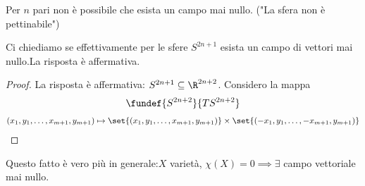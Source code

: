 \begin{cor}
 Per $n$ pari non è possibile che esista un campo mai nullo.
 ("La sfera non è pettinabile")
\end{cor}
\begin{prop}
 Ci chiediamo se effettivamente per le sfere $S^{2n+1}$ esista un campo di vettori mai nullo.La risposta è affermativa.
\end{prop}
\begin{proof}
La risposta è affermativa: $S^{2n+1}\subseteq\R^{2n+2}$. Considero la mappa 
\begin{align*}
 \fundef{S^{2n+2}}{TS^{2n+2}}
\end{align*}
\begin{align*}
 (x_1, y_1,\dots, x_{m+1}, y_{m+1})\mapsto \set{(x_1, y_1,\dots, x_{m+1}, y_{m+1})}\times\set{(-x_1, y_1,\dots, -x_{m+1}, y_{m+1})}
\end{align*}


\end{proof}
\begin{oss}
 Questo fatto è vero più in generale:$X$ varietà, $\chi(X)=0\implies \exists$ campo vettoriale mai nullo.
\end{oss}

